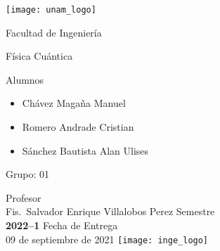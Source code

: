 \begin{titlepage}
  \centering
    \texttt{[image: unam\_logo]}\vspace{0.5cm}

    {\scshape{\Huge Facultad de Ingeniería\par{}}}\vspace{0.25cm}

    {\scshape{\Large Física Cuántica\par{}}}\vfill{}


    {\huge \textbf{\tituloTrabajo{}}}\vfill{}


    {\Large
      Alumnos
      \begin{itemize}
        \item Chávez Magaña Manuel
        \item Romero Andrade Cristian
        \item Sánchez Bautista Alan Ulises
      \end{itemize}
    }\vfill{}

      {\large Grupo: 01\par{}}\vfill{}

    {\large Profesor\\Fis.~Salvador Enrique Villalobos Perez}\vfill{}
    \vfil{}
    {\large Semestre\\\textbf{2022--1}}
    \vfill{}
    {\large Fecha de Entrega\\09 de septiembre de 2021}
    \vfill{}
    \texttt{[image: inge\_logo]}

\end{titlepage}
